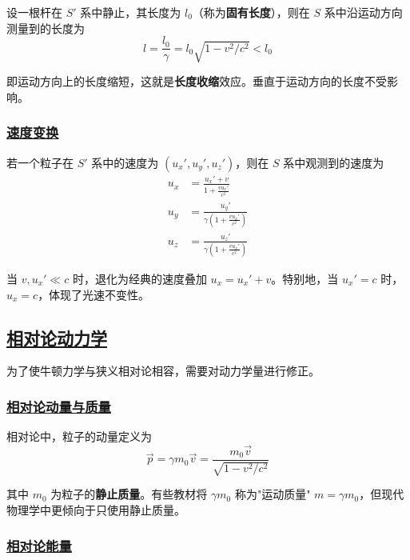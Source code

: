 设一根杆在 $S'$ 系中静止，其长度为 $l_0$（称为\textbf{固有长度}），则在 $S$ 系中沿运动方向测量到的长度为
\begin{equation}
    l = \frac{l_0}{\gamma} = l_0\sqrt{1 - v^2/c^2} < l_0
\end{equation}

即运动方向上的长度缩短，这就是\textbf{长度收缩}效应。垂直于运动方向的长度不受影响。

\subsubsection{\protect\hyperlink{:}{速度变换}}

若一个粒子在 $S'$ 系中的速度为 $(u_x', u_y', u_z')$，则在 $S$ 系中观测到的速度为
\begin{align}
    u_x &= \frac{u_x' + v}{1 + \frac{vu_x'}{c^2}} \\
    u_y &= \frac{u_y'}{\gamma\left(1 + \frac{vu_x'}{c^2}\right)} \\
    u_z &= \frac{u_z'}{\gamma\left(1 + \frac{vu_x'}{c^2}\right)}
\end{align}

当 $v, u_x' \ll c$ 时，退化为经典的速度叠加 $u_x = u_x' + v$。特别地，当 $u_x' = c$ 时，$u_x = c$，体现了光速不变性。

\subsection{\protect\hyperlink{:}{相对论动力学}}

为了使牛顿力学与狭义相对论相容，需要对动力学量进行修正。

\subsubsection{\protect\hyperlink{:}{相对论动量与质量}}

相对论中，粒子的动量定义为
\begin{equation}
    \vec{p} = \gamma m_0 \vec{v} = \frac{m_0 \vec{v}}{\sqrt{1 - v^2/c^2}}
\end{equation}

其中 $m_0$ 为粒子的\textbf{静止质量}。有些教材将 $\gamma m_0$ 称为"运动质量" $m = \gamma m_0$，但现代物理学中更倾向于只使用静止质量。

\subsubsection{\protect\hyperlink{:}{相对论能量}}

